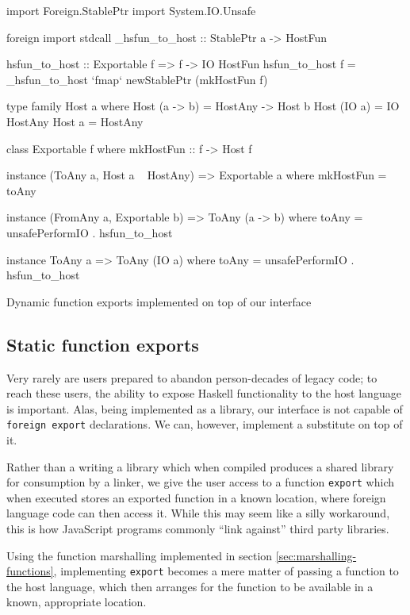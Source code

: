 \documentclass[preprint]{sigplanconf}
\begin{document}
\begin{listingfloat}
\begin{code}
import Foreign.StablePtr
import System.IO.Unsafe

foreign import stdcall
  _hsfun_to_host :: StablePtr a -> HostFun

hsfun_to_host :: Exportable f => f -> IO HostFun
hsfun_to_host f =
  _hsfun_to_host `fmap` newStablePtr (mkHostFun f)

type family Host a where
  Host (a -> b) = HostAny -> Host b
  Host (IO a)   = IO HostAny
  Host a        = HostAny

class Exportable f where
  mkHostFun :: f -> Host f

instance (ToAny a, Host a ~ HostAny) =>
          Exportable a where
  mkHostFun = toAny

instance (FromAny a, Exportable b) =>
          ToAny (a -> b) where
  toAny = unsafePerformIO . hsfun_to_host

instance ToAny a => ToAny (IO a) where
  toAny = unsafePerformIO . hsfun_to_host
\end{code}
\caption{Dynamic function exports implemented on top of our interface}
\label{lst:export-final}
\end{listingfloat}

\subsection{Static function exports}
\label{sec:exports}
Very rarely are users prepared to abandon person-decades of legacy code;
to reach these users, the ability to expose Haskell functionality to the host
language is important. Alas, being implemented as a library, our interface is
not capable of \lstinline!foreign export! declarations. We can, however,
implement a substitute on top of it.

Rather than a writing a library which when compiled produces a shared library
for consumption by a linker, we give the user access to a function
\lstinline!export! which when executed stores an exported function in a
known location, where foreign language code can then access it.
While this may seem like a silly workaround, this is how JavaScript programs
commonly ``link against'' third party libraries.

Using the function marshalling implemented in section
\ref{sec:marshalling-functions}, implementing \lstinline!export! becomes a
mere matter of passing a function to the host language, which then
arranges for the function to be available in a known, appropriate location.
\end{document}
